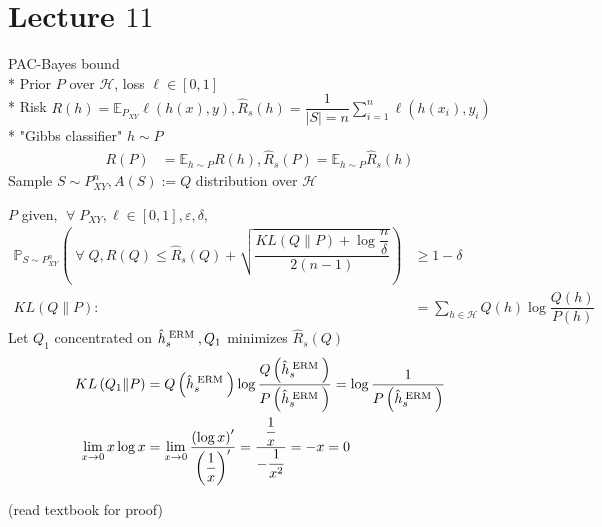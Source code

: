 \documentclass{article}
\begin{document}
\section{Lecture $11$} 
PAC-Bayes bound
\\* Prior $P $ over $\mathcal{H}$, loss $\ell \in \left[0, 1\right]$
\\* Risk $R\left(h\right)  = \mathbb{E}_{P_{X Y}} \ell\left(h\left(x\right), y\right), \hat{R}_{s}\left(h\right) = \dfrac{1}{| S | = n} \displaystyle\sum_{i=1}^{n} \ell\left(h\left(x_{i}\right), y_{i}\right)$
\\* "Gibbs classifier" $h  \sim  P $
\begin{align*}
R\left(P\right)  &= \mathbb{E}_{h \sim  P} R\left(h\right) , \hat{R}_{s}\left(P\right) = \mathbb{E}_{h \sim  P} \hat{R}_{s}\left(h\right)
\end{align*}
Sample $S  \sim  P_{X Y}^{n}, A\left(S\right)  := Q $ distribution over $\mathcal{H}$
\newline \newline
\begin{thm} \label{thm:pacbb} 
$P $ given, $\;\forall\; P_{XY}, \ell \in \left[0, 1\right], \varepsilon, \delta$,
\begin{align*}
\mathbb{P}_{S \sim  P_{XY}^{n}}\left(\;\forall\; Q , R\left(Q\right) \leq  \hat{R}_{s}\left(Q\right) + \sqrt{\dfrac{KL  \left(Q \| P\right) + \log \dfrac{n}{\delta}}{2 \left(n - 1\right)}}\right) &\geq  1 - \delta
\\ KL\left(Q \| P\right)  :&= \displaystyle\sum_{h \in \mathcal{H}} Q\left(h\right) \log \dfrac{Q\left(h\right)}{P\left(h\right)}
\end{align*}
Let $Q_{1}$ concentrated on $\hat{h}_{s}^{\text{\;ERM\;}}, Q_{1}$ minimizes $\hat{R}_{s}\left(Q\right)$
\begin{align*}
KL\left(Q_{1} \| P\right)  &= Q\left(\hat{h}_{s}^{\text{\;ERM\;}}\right) \log \dfrac{Q\left(\hat{h}_{s}^{\text{\;ERM\;}}\right)}{P\left(\hat{h}_{s}^{\text{\;ERM\;}}\right)} = \log \dfrac{1}{P\left(\hat{h}_{s}^{\text{\;ERM\;}}\right)}
\\ \lim_{x \to  0} x \log x &= \lim_{x \to  0} \dfrac{\left(\log x\right)'}{\left(\dfrac{1}{x}\right)'} = \dfrac{\dfrac{1}{x}}{- \dfrac{1}{x^{2}}} = - x = 0
\end{align*}\end{thm}
(read textbook for proof)
\newline \newline
\end{document}
